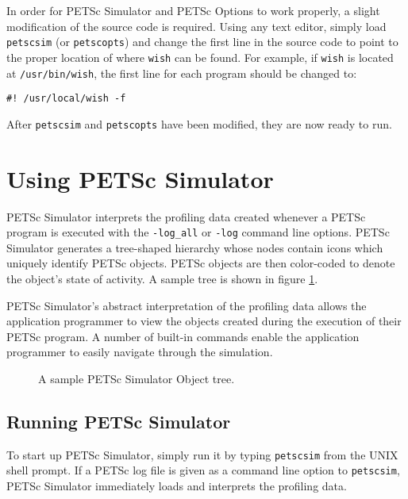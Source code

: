 In order for PETSc Simulator and PETSc Options to work properly, a slight modification of the source code is required.  Using any text editor, simply load {\tt petscsim} (or {\tt petscopts}) and change the first line in the source code to point to the proper location of where {\tt wish} can be found.  For example, if {\tt wish} is located at {\tt /usr/bin/wish}, the first line for each program should be changed to:
\begin{verbatim}
#! /usr/local/wish -f
\end{verbatim}
After {\tt petscsim} and {\tt petscopts} have been modified, they are now ready to run.

\newpage
\section{Using PETSc Simulator}

PETSc Simulator interprets the profiling data created whenever a PETSc program is executed with the {\tt -log\_all} or {\tt -log} command line options.  PETSc Simulator generates a tree-shaped hierarchy whose nodes contain icons which uniquely identify PETSc objects.  PETSc objects are then color-coded to denote the object's state of activity.  A sample tree is shown in figure \ref{example tree}.

PETSc Simulator's abstract interpretation of the profiling data allows the application programmer to view the objects created during the execution of their PETSc program.  A number of built-in commands enable the application programmer to easily navigate through the simulation.

\begin{figure}
\centerline{}
\caption{A sample PETSc Simulator Object tree.}
\label{example tree}
\end{figure}

\subsection{Running PETSc Simulator}

To start up PETSc Simulator, simply run it by typing {\tt petscsim} from the UNIX shell prompt.  If a PETSc log file is given as a command line option to {\tt petscsim}, PETSc Simulator immediately loads and interprets the profiling data.

